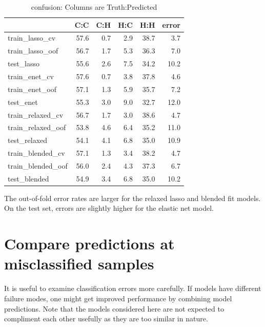 \documentclass[
]{book}
\begin{document}
\begin{table}

\caption{\label{tab:confMtxTrainLasso}confusion: Columns are Truth:Predicted}
\centering
\begin{tabular}[t]{l|r|r|r|r|r}
\hline
  & C:C & C:H & H:C & H:H & error\\
\hline
train\_lasso\_cv & 57.6 & 0.7 & 2.9 & 38.7 & 3.7\\
\hline
train\_lasso\_oof & 56.7 & 1.7 & 5.3 & 36.3 & 7.0\\
\hline
test\_lasso & 55.6 & 2.6 & 7.5 & 34.2 & 10.2\\
\hline
train\_enet\_cv & 57.6 & 0.7 & 3.8 & 37.8 & 4.6\\
\hline
train\_enet\_oof & 57.1 & 1.3 & 5.9 & 35.7 & 7.2\\
\hline
test\_enet & 55.3 & 3.0 & 9.0 & 32.7 & 12.0\\
\hline
train\_relaxed\_cv & 56.7 & 1.7 & 3.0 & 38.6 & 4.7\\
\hline
train\_relaxed\_oof & 53.8 & 4.6 & 6.4 & 35.2 & 11.0\\
\hline
test\_relaxed & 54.1 & 4.1 & 6.8 & 35.0 & 10.9\\
\hline
train\_blended\_cv & 57.1 & 1.3 & 3.4 & 38.2 & 4.7\\
\hline
train\_blended\_oof & 56.0 & 2.4 & 4.3 & 37.3 & 6.7\\
\hline
test\_blended & 54.9 & 3.4 & 6.8 & 35.0 & 10.2\\
\hline
\end{tabular}
\end{table}

The out-of-fold error rates are larger for the relaxed lasso and blended fit models.
On the test set, errors are slightly higher for the elastic net model.

\hypertarget{compare-predictions-at-misclassified-samples}{%
\section{Compare predictions at misclassified samples}\label{compare-predictions-at-misclassified-samples}}

It is useful to examine classification errors more carefully.
If models have different failure modes, one might get improved
performance by combining model predictions. Note that the models
considered here are not expected to compliment each other usefully
as they are too similar in nature.
\end{document}
